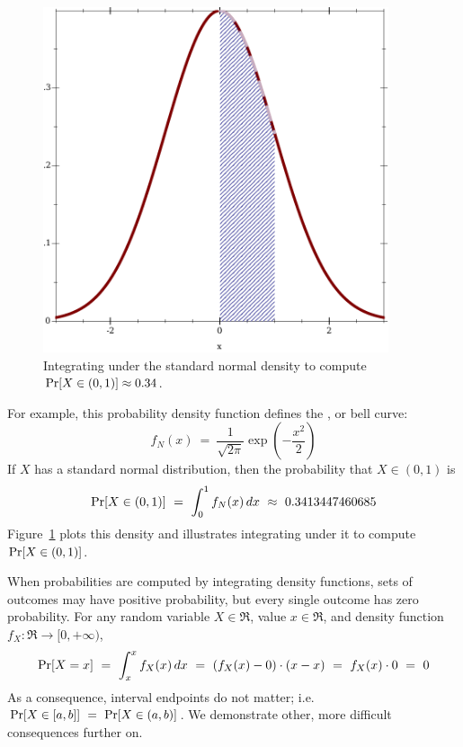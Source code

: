 \begin{figure}[tb]\centering
\includegraphics[width=4in]{density-integrate}
\caption[Computing probabilities using the standard normal density function]{Integrating under the standard normal density to compute $\mathrm{Pr}\!\left[{X \in (0,1)}\right] \approx 0.34$.}
\label{fig:density-integrate}
\end{figure}

For example, this probability density function defines the , or bell curve:
\begin{equation}
	f_N(x)\ =\ \frac{1}{\sqrt{2\pi}} \exp\left(-\frac{x^2}{2}\right)
\end{equation}
If $X$ has a standard normal distribution, then the probability that $X \in (0,1)$ is
\begin{equation}
	\mathrm{Pr}\!\left[{X \in (0,1)}\right]\ =\ \int_0^1 f_N(x)\,dx\ \approx\ 0.3413447460685
\end{equation}
Figure~\ref{fig:density-integrate} plots this density and illustrates integrating under it to compute $\mathrm{Pr}\!\left[{X \in (0,1)}\right]$.

When probabilities are computed by integrating density functions, sets of outcomes may have positive probability, but every single outcome has zero probability.
For any random variable $X \in \Re$, value $x \in \Re$, and density function $f_X : \Re \to [0,+\infty)$,
\begin{equation}
	\Pspec{X = x}\ =\ \int_x^x f_X(x)\, dx\ =\ (f_X(x) - 0) \cdot (x - x)\ =\ f_X(x) \cdot 0\ =\ 0
\end{equation}
As a consequence, interval endpoints do not matter; i.e. $\mathrm{Pr}\!\left[{X \in [a,b]}\right]\ =\ \mathrm{Pr}\!\left[{X \in (a,b)}\right]$.
We demonstrate other, more difficult consequences further on.

